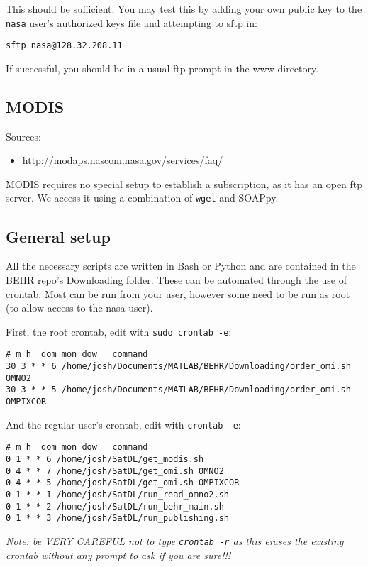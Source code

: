 \documentclass[12pt]{article}
\begin{document}
	This should be sufficient. You may test this by adding your own public key to the \lstinline$nasa$ user's authorized keys file and attempting to sftp in:
\begin{lstlisting}
sftp nasa@128.32.208.11
\end{lstlisting}
If successful, you should be in a usual ftp prompt in the www directory.

\subsection{MODIS}
	Sources:
	\begin{itemize}
	\item \url{http://modaps.nascom.nasa.gov/services/faq/}
	\end{itemize}
	MODIS requires no special setup to establish a subscription, as it has an open ftp server. We access it using a combination of \lstinline$wget$ and SOAPpy.
	
\subsection{General setup}
	All the necessary scripts are written in Bash or Python and are contained in the BEHR repo's Downloading folder. These can be automated through the use of crontab. Most can be run from your user, however some need to be run as root (to allow access to the nasa user).
	
	First, the root crontab, edit with \lstinline$sudo crontab -e$:
	\begin{lstlisting}[basicstyle=\ttfamily\scriptsize]
# m h  dom mon dow   command
30 3 * * 6 /home/josh/Documents/MATLAB/BEHR/Downloading/order_omi.sh OMNO2
30 3 * * 5 /home/josh/Documents/MATLAB/BEHR/Downloading/order_omi.sh OMPIXCOR
	\end{lstlisting}
	
	And the regular user's crontab, edit with \lstinline$crontab -e$:
	\begin{lstlisting}[basicstyle=\ttfamily\scriptsize]
# m h  dom mon dow   command
0 1 * * 6 /home/josh/SatDL/get_modis.sh
0 4 * * 7 /home/josh/SatDL/get_omi.sh OMNO2
0 4 * * 5 /home/josh/SatDL/get_omi.sh OMPIXCOR
0 1 * * 1 /home/josh/SatDL/run_read_omno2.sh
0 1 * * 2 /home/josh/SatDL/run_behr_main.sh
0 1 * * 3 /home/josh/SatDL/run_publishing.sh
	\end{lstlisting}

	\emph{Note: be VERY CAREFUL not to type \lstinline$crontab -r$ as this erases the existing crontab without any prompt to ask if you are sure!!!}	
	
\end{document}
